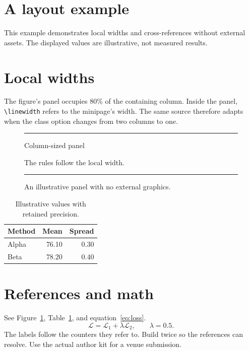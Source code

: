 \documentclass[twocolumn]{article}
\begin{document}
\section*{A layout example}
This example demonstrates local widths and cross-references without external
assets. The displayed values are illustrative, not measured results.

\section{Local widths}
The figure's panel occupies 80\% of the containing column. Inside the panel,
\verb|\linewidth| refers to the minipage's width. The same source therefore
adapts when the class option changes from two columns to one.

\begin{figure}[htbp]
  \centering
  \begin{minipage}{0.8\linewidth}
    \noindent\rule{\linewidth}{0.4pt}\par
    \smallskip
    \centering
    Column-sized panel\par
    The rules follow the local width.
    \par\smallskip
    \noindent\rule{\linewidth}{0.4pt}
  \end{minipage}
  \caption{An illustrative panel with no external graphics.}
  \label{fig:panel}
\end{figure}

\begin{table}[htbp]
  \centering
  \caption{Illustrative values with retained precision.}
  \label{tab:illustration}
  \begin{tabular*}{\linewidth}{@{\extracolsep{\fill}}lrr@{}}
    \toprule
    Method & Mean & Spread \\
    \midrule
    Alpha & 76.10 & 0.30 \\
    Beta & 78.20 & 0.40 \\
    \bottomrule
  \end{tabular*}
\end{table}

\section{References and math}
See Figure~\ref{fig:panel}, Table~\ref{tab:illustration}, and
equation~\eqref{eq:loss}.
\begin{equation}
  \mathcal{L}=\mathcal{L}_1+\lambda\mathcal{L}_2,
  \qquad \lambda=0.5.
  \label{eq:loss}
\end{equation}
The labels follow the counters they refer to. Build twice so the references
can resolve. Use the actual author kit for a venue submission.
\end{document}

